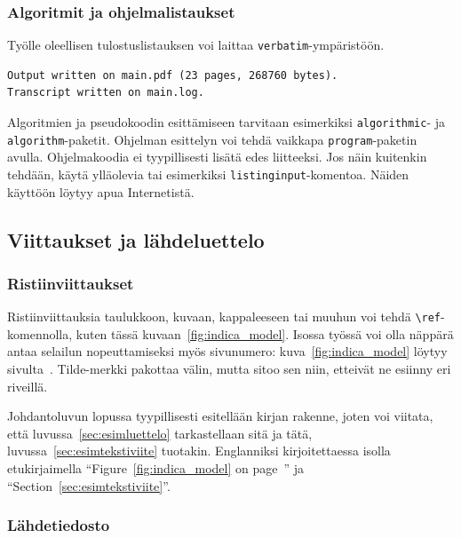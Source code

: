 \subsubsection{Algoritmit ja ohjelmalistaukset}

Työlle oleellisen tulostuslistauksen voi laittaa
\verb!verbatim!-ympäristöön.
%
\begin{verbatim}
Output written on main.pdf (23 pages, 268760 bytes).
Transcript written on main.log.
\end{verbatim}
%
\begin{sloppypar}
Algoritmien ja pseudokoodin esittämiseen tarvitaan esimerkiksi
\verb!algorithmic!- ja \verb!algorithm!-paketit.  Ohjelman esittelyn
voi tehdä vaikkapa \verb!program!-paketin avulla.  Ohjelmakoodia ei
tyypillisesti lisätä edes liitteeksi.  Jos näin kuitenkin tehdään,
käytä ylläolevia tai esimerkiksi \verb!listinginput!-komentoa. Näiden
käyttöön löytyy apua Internetistä.
\end{sloppypar}

\subsection{Viittaukset ja lähdeluettelo}
\label{sec:esimviitteet}


\subsubsection{Ristiinviittaukset}
\label{sec:esimristiviite}

Ristiinviittauksia taulukkoon, kuvaan, kappaleeseen tai muuhun voi
tehdä \verb!\ref!-komennolla, kuten tässä
kuvaan~\ref{fig:indica_model}.  Isossa työssä voi olla näppärä antaa
selailun nopeuttamiseksi myös sivunumero: kuva~\ref{fig:indica_model}
löytyy sivulta~\pageref{fig:indica_model}. Tilde-merkki pakottaa
välin, mutta sitoo sen niin, etteivät ne esiinny eri riveillä.

Johdantoluvun lopussa tyypillisesti esitellään kirjan rakenne, joten
voi viitata, että luvussa~\ref{sec:esimluettelo} tarkastellaan sitä ja
tätä, luvussa~\ref{sec:esimtekstiviite} tuotakin. Englanniksi
kirjoitettaessa isolla etukirjaimella ``Figure~\ref{fig:indica_model} on
page~\pageref{fig:indica_model}'' ja ``Section~\ref{sec:esimtekstiviite}''.


\subsubsection{Lähdetiedosto}
\label{sec:esimlahdetiedosto}

